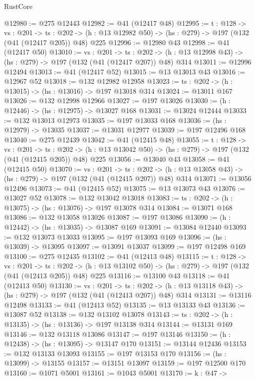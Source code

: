 \begin{lexlean}{RustCore}
\begin{coremodule}
@12980 := @275 @12443
@12982 := @41 (@12417 @48)
@12995 := {t : @128} ->
  {vs : @201} ->
  {ts : @202} -> (h : @13 @12982 @50) -> (hs : @279) -> @197 (@132 (@41 (@12417 @205)) @48) @225
@12996 := @12980 @43
@12998 := @41 (@12417 @50)
@13010 := {vs : @201} ->
  {ts : @202} -> (h : @13 @12998 @43) -> (hs : @279) -> @197 (@132 (@41 (@12417 @207)) @48) @314
@13011 := @12996 @12494
@13013 := @41 (@12417 @52)
@13015 := @13 @13013 @43
@13016 := @12967 @52
@13018 := @132 @12982 @12958
@13023 := {ts : @202} -> (h : @13015) -> (hs : @13016) -> @197 @13018 @314
@13024 := @13011 @167
@13026 := @132 @12998 @12966
@13027 := @197 @13026
@13030 := (h : @12446) -> (hs : @12975) -> @13027 @168
@13031 := @13024 @12444
@13033 := @132 @13013 @12973
@13035 := @197 @13033 @168
@13036 := (hs : @12979) -> @13035
@13037 := @13031 @12977
@13039 := @197 @12496 @168
@13040 := @275 @12439
@13042 := @41 (@12415 @48)
@13055 := {t : @128} ->
  {vs : @201} ->
  {ts : @202} -> (h : @13 @13042 @50) -> (hs : @279) -> @197 (@132 (@41 (@12415 @205)) @48) @225
@13056 := @13040 @43
@13058 := @41 (@12415 @50)
@13070 := {vs : @201} ->
  {ts : @202} -> (h : @13 @13058 @43) -> (hs : @279) -> @197 (@132 (@41 (@12415 @207)) @48) @314
@13071 := @13056 @12496
@13073 := @41 (@12415 @52)
@13075 := @13 @13073 @43
@13076 := @13027 @52
@13078 := @132 @13042 @13018
@13083 := {ts : @202} -> (h : @13075) -> (hs : @13076) -> @197 @13078 @314
@13084 := @13071 @168
@13086 := @132 @13058 @13026
@13087 := @197 @13086
@13090 := (h : @12442) -> (hs : @13035) -> @13087 @169
@13091 := @13084 @12440
@13093 := @132 @13073 @13033
@13095 := @197 @13093 @169
@13096 := (hs : @13039) -> @13095
@13097 := @13091 @13037
@13099 := @197 @12498 @169
@13100 := @275 @12435
@13102 := @41 (@12413 @48)
@13115 := {t : @128} ->
  {vs : @201} ->
  {ts : @202} -> (h : @13 @13102 @50) -> (hs : @279) -> @197 (@132 (@41 (@12413 @205)) @48) @225
@13116 := @13100 @43
@13118 := @41 (@12413 @50)
@13130 := {vs : @201} ->
  {ts : @202} -> (h : @13 @13118 @43) -> (hs : @279) -> @197 (@132 (@41 (@12413 @207)) @48) @314
@13131 := @13116 @12498
@13133 := @41 (@12413 @52)
@13135 := @13 @13133 @43
@13136 := @13087 @52
@13138 := @132 @13102 @13078
@13143 := {ts : @202} -> (h : @13135) -> (hs : @13136) -> @197 @13138 @314
@13144 := @13131 @169
@13146 := @132 @13118 @13086
@13147 := @197 @13146
@13150 := (h : @12438) -> (hs : @13095) -> @13147 @170
@13151 := @13144 @12436
@13153 := @132 @13133 @13093
@13155 := @197 @13153 @170
@13156 := (hs : @13099) -> @13155
@13157 := @13151 @13097
@13159 := @197 @12500 @170
@13160 := @1071 @5001
@13161 := @1043 @5001
@13170 := {k : @47} ->

\end{coremodule}
\end{lexlean}
